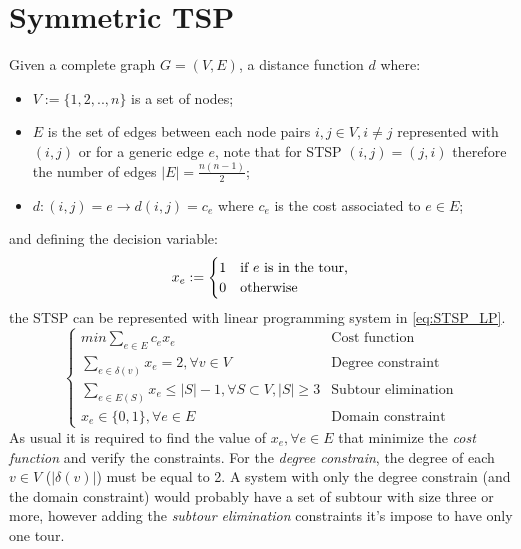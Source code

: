 \section{Symmetric TSP}
Given a complete graph $ G = (V, E) $, a distance function $ d $ where:
\begin{itemize}
	\item $ V := \{1, 2, .., n\}$ is a set of nodes;
	\item $ E $ is the set of edges between each node pairs $ i,j \in V, i \ne j $ represented with $ (i,j) $ or for a generic edge $ e $, note that for STSP $ (i,j) = (j,i) $ therefore the number of edges $ |E| = \frac{n(n-1)}{2} $;
	\item $ d: (i,j) = e \to d(i,j) = c_e $ where $ c_e $ is the cost associated to $ e \in E $;
\end{itemize}
and defining the decision variable:
\[
x_e := \begin{cases}
	1 & \text{if $ e $ is in the tour,} \\
	0 & \text{otherwise}
\end{cases}
\] 
the STSP can be represented with linear programming system in \ref{eq:STSP_LP}. 
\begin{equation}
\begin{cases}
		min \sum_{ e\in E } c_ex_e & \text{Cost function} \\
		\sum_{e\in \delta (v) } x_e = 2, \forall v \in V  & \text{Degree constraint} \\
		\sum_{e\in E(S) } x_e \le |S|-1, \forall S \subset V, |S| \ge 3  & \text{Subtour elimination} \\
		x_e \in \{0,1\}, \forall e \in E & \text{Domain constraint}
\end{cases}
\label{eq:STSP_LP}
\end{equation} 
As usual it is required to find the value of $ x_e, \forall e \in E $ that minimize the \textit{cost function} and verify the constraints.
For the \textit{degree constrain}, the degree of each $ v \in V $ ($ |\delta(v)| $) must be equal to 2. A system with only the degree constrain (and the domain constraint) would probably have a set of subtour with size three or more, however adding the \textit{subtour elimination} constraints  it's impose to have only one tour. 


